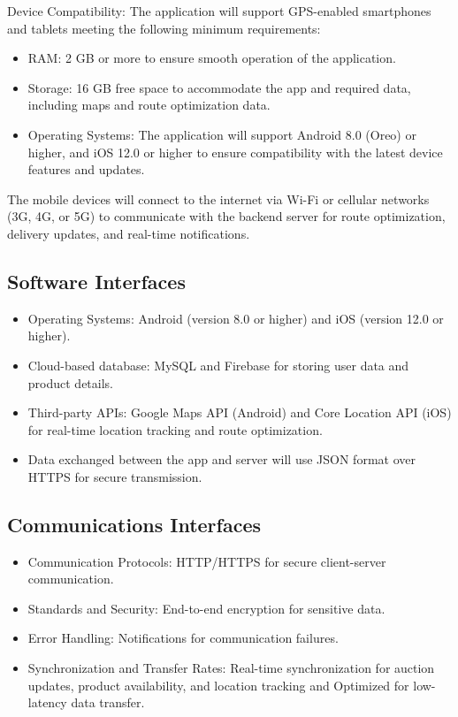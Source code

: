 Device Compatibility: The application will support GPS-enabled smartphones and tablets meeting the following minimum requirements:
\begin{itemize}
    \item RAM: 2 GB or more to ensure smooth operation of the application.
    \item Storage: 16 GB free space to accommodate the app and required data, including maps and route optimization data.
    \item Operating Systems: The application will support Android 8.0 (Oreo) or higher, and iOS 12.0 or higher to ensure compatibility with the latest device features and updates.
\end{itemize}
The mobile devices will connect to the internet via Wi-Fi or cellular networks (3G, 4G, or 5G) to communicate with the backend server for route optimization, delivery updates, and real-time notifications.

\subsection{Software Interfaces}

\begin{itemize}
    \item Operating Systems: Android (version 8.0 or higher) and iOS (version 12.0 or higher).
    \item Cloud-based database: MySQL and Firebase for storing user data and product details.
    \item Third-party APIs: Google Maps API (Android) and Core Location API (iOS) for real-time location tracking and route optimization.
    \item Data exchanged between the app and server  will use JSON format over HTTPS for secure transmission.
\end{itemize}

\subsection{Communications Interfaces}

\begin{itemize}
    \item Communication Protocols: HTTP/HTTPS for secure client-server communication.
    \item Standards and Security: End-to-end encryption for sensitive data.
    \item Error Handling: Notifications for communication failures.
    \item Synchronization and Transfer Rates: Real-time synchronization for auction updates, product availability, and location tracking and Optimized for low-latency data transfer.
\end{itemize}

